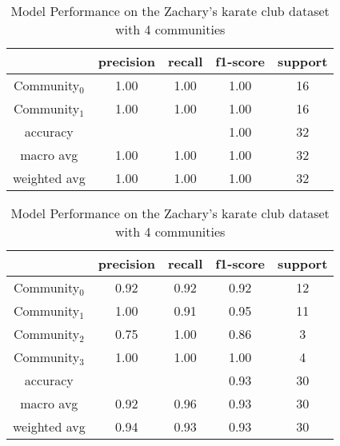\begin{table}[H]
\setlength{\tabcolsep}{5pt}
\parbox{.5\linewidth}{
\centering
\begin{tabular}{|c|c|c|c|c|}
\hline
 & precision & recall & f1-score & support \\
\hline\hline
Community$_0$ & 1.00 & 1.00 & 1.00 & 16  \\
Community$_1$ & 1.00 & 1.00 & 1.00 & 16 \\
\hline\hline
accuracy & & & 1.00 & 32 \\
macro avg & 1.00 & 1.00 & 1.00 & 32 \\
weighted avg & 1.00 & 1.00 & 1.00 & 32 \\
\hline
\end{tabular}
\caption{Model Performance on the Zachary's karate club dataset with 2 communities}
\label{tab:karate2_PRF}
}
\hfill
\parbox{.5\linewidth}{
\centering
\begin{tabular}{|c|c|c|c|c|}
\hline
 & precision & recall & f1-score & support \\
\hline\hline
Community$_0$ & 0.92 & 0.92 & 0.92 & 12  \\
Community$_1$ & 1.00 & 0.91 & 0.95 & 11 \\
Community$_2$ & 0.75 & 1.00 & 0.86 & 3 \\
Community$_3$ & 1.00 & 1.00 & 1.00 & 4 \\
\hline\hline
accuracy & & & 0.93 & 30 \\
macro avg & 0.92 & 0.96 & 0.93 & 30 \\
weighted avg & 0.94 & 0.93 & 0.93 & 30 \\
\hline
\end{tabular}
\caption{Model Performance on the Zachary's karate club dataset with 4 communities}
\label{tab:karate4_PRF}
}
\end{table}
